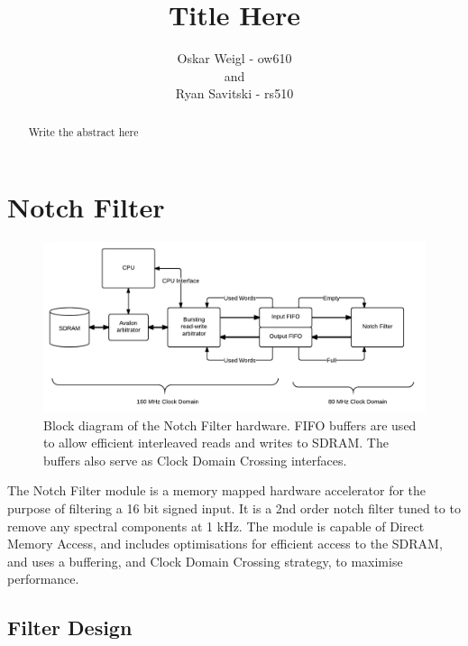 \documentclass[]{article}
\title{Title Here}
\author{Oskar Weigl - ow610\\ and \\ Ryan Savitski - rs510}
\begin{document}
\maketitle

\begin{abstract}
	Write the abstract here
\end{abstract}

\tableofcontents
\clearpage


\section{Notch Filter} %
\label{sec:notch_filter}

\begin{figure}[htbp]
	\begin{center}
		\includegraphics[width = \textwidth]{DSDNotch.pdf}
	\end{center}
	\caption{Block diagram of the Notch Filter hardware. FIFO buffers are used to allow efficient interleaved reads and writes to SDRAM. The buffers also serve as Clock Domain Crossing interfaces.}
	\label{fig:DSDNotch}
\end{figure}


The Notch Filter module is a memory mapped hardware accelerator for the purpose of filtering a 16 bit signed input. It is a 2nd order notch filter tuned to to remove any spectral components at 1 kHz.
The module is capable of Direct Memory Access, and includes optimisations for efficient access to the SDRAM, and uses a buffering, and Clock Domain Crossing strategy, to maximise performance.


\subsection{Filter Design} %
\label{sub:filter_design}
\end{document}

